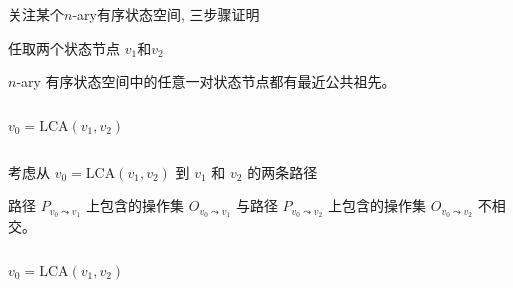 \begin{frame}{}
  \centerline{}
\end{frame}

\begin{frame}{}
  \begin{center}
    {\large 关注某个$n$-ary有序状态空间, 三步骤证明}
  \end{center}

\end{frame}

\begin{frame}{}
  \centerline{ 任取两个状态节点 $v_1$和$v_2$}

  \begin{clemma}
    $n$-ary 有序状态空间中的任意一对状态节点都有最近公共祖先。
  \end{clemma}

  \begin{columns}
	\[
	  v_0 = \text{LCA}(v_1, v_2)
	\]
  \end{columns}
\end{frame}

\begin{frame}{}
  \centerline{ 考虑从 $v_0 = \text{LCA}(v_1, v_2)$ 到 $v_1$ 和 $v_2$ 的两条路径}

  \begin{clemma}
    路径 $P_{v_0 \leadsto v_1}$ 上包含的操作集 $O_{v_0 \leadsto v_1}$ 与路径 $P_{v_0 \leadsto v_2}$ 上包含的操作集
    $O_{v_0 \leadsto v_2}$ 不相交。
  \end{clemma}

  \begin{columns}
	\[
	  v_0 = \text{LCA}(v_1, v_2)
	\]
  \end{columns}
\end{frame}

